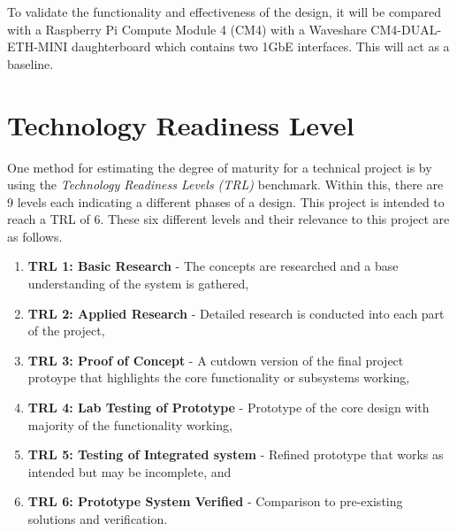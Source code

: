 To validate the functionality and effectiveness of the design, it will be compared with a Raspberry Pi Compute Module 4 (CM4) with a Waveshare CM4-DUAL-ETH-MINI 
daughterboard which contains two 1GbE interfaces. This will act as a baseline. 

\section{Technology Readiness Level}

One method for estimating the degree of maturity for a technical project is by using the \textit{Technology Readiness Levels (TRL)} benchmark. Within this, 
there are 9 levels each indicating a different phases of a design. This project is intended to reach a TRL of 6. These six different levels and their 
relevance to this project are as follows. 

\begin{enumerate}
    \item \textbf{TRL 1: Basic Research} - The concepts are researched and a base understanding of the system is gathered,
    \item \textbf{TRL 2: Applied Research} - Detailed research is conducted into each part of the project,
    \item \textbf{TRL 3: Proof of Concept} - A cutdown version of the final project protoype that highlights the core functionality or subsystems working,
    \item \textbf{TRL 4: Lab Testing of Prototype} - Prototype of the core design with majority of the functionality working,
    \item \textbf{TRL 5: Testing of Integrated system} - Refined prototype that works as intended but may be incomplete, and
    \item \textbf{TRL 6: Prototype System Verified} - Comparison to pre-existing solutions and verification. 
\end{enumerate}


